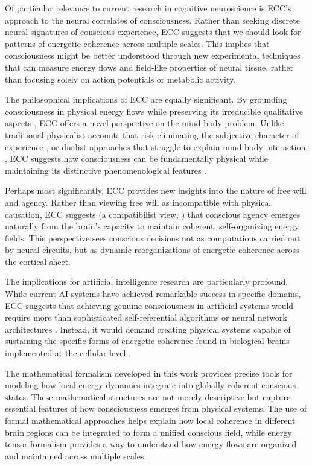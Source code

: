 \begin{refsection}
Of particular relevance to current research in cognitive neuroscience is ECC's approach to the neural correlates of consciousness. Rather than seeking discrete neural signatures of conscious experience, ECC suggests that we should look for patterns of energetic coherence across multiple scales. This implies that consciousness might be better understood through new experimental techniques that can measure energy flows and field-like properties of neural tissue, rather than focusing solely on action potentials or metabolic activity.

The philosophical implications of ECC are equally significant. By grounding consciousness in physical energy flows while preserving its irreducible qualitative aspects \cite{nagel1980like}, ECC offers a novel perspective on the mind-body problem. Unlike traditional physicalist accounts that risk eliminating the subjective character of experience \cite{dennett1993consciousness}, or dualist approaches that struggle to explain mind-body interaction \cite{chalmers1997conscious}, ECC suggests how consciousness can be fundamentally physical while maintaining its distinctive phenomenological features \cite{block1995confusion}.

Perhaps most significantly, ECC provides new insights into the nature of free will and agency. Rather than viewing free will as incompatible with physical causation, ECC suggests (a compatibilist view, \cite{Beebee2002}) that conscious agency emerges naturally from the brain's capacity to maintain coherent, self-organizing energy fields. This perspective sees conscious decisions not as computations carried out by neural circuits, but as dynamic reorganizations of energetic coherence across the cortical sheet.

The implications for artificial intelligence research are particularly profound. While current AI systems have achieved remarkable success in specific domains, ECC suggests that achieving genuine consciousness in artificial systems would require more than sophisticated self-referential algorithms or neural network architectures \cite{hofstadter1999godel,Rumelhart1986}. Instead, it would demand creating physical systems capable of sustaining the specific forms of energetic coherence found in biological brains implemented at the cellular level \cite{margulis2001conscious}.

The mathematical formalism developed in this work provides precise tools for modeling how local energy dynamics integrate into globally coherent conscious states. These mathematical structures are not merely descriptive but capture essential features of how consciousness emerges from physical systems. The use of formal mathematical approaches helps explain how local coherence in different brain regions can be integrated to form a unified conscious field, while energy tensor formalism provides a way to understand how energy flows are organized and maintained across multiple scales.


\end{refsection}
